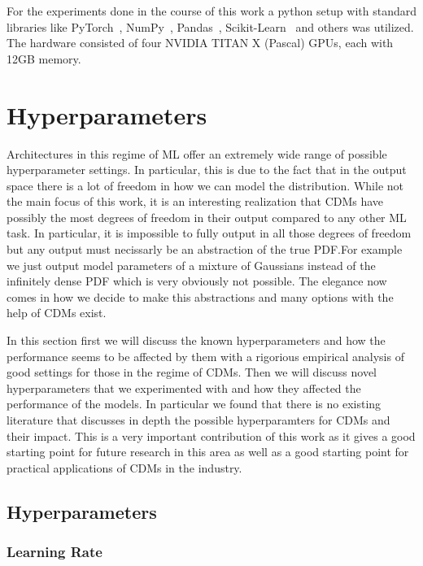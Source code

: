 For the experiments done in the course of this work a python setup with standard libraries like PyTorch~\cite{paszke2019pytorch}, NumPy~\cite{harris2020array}, Pandas~\cite{reback2020pandas}, Scikit-Learn~\cite{scikit-learn} and others was utilized. The hardware consisted of four NVIDIA TITAN X (Pascal) GPUs, each with 12GB memory.

\section{Hyperparameters}\label{sec:hyperparameters}

Architectures in this regime of ML offer an extremely wide range of possible hyperparameter settings. In particular, this is due to the fact that in the output space there is a lot of freedom in how we can model the distribution. While not the main focus of this work, it is an interesting realization that CDMs have possibly the most degrees of freedom in their output compared to any other ML task. In particular, it is impossible to fully output in all those degrees of freedom but any output must necissarly be an abstraction of the true PDF.\@ For example we just output model parameters of a mixture of Gaussians instead of the infinitely dense PDF which is very obviously not possible. The elegance now comes in how we decide to make this abstractions and many options with the help of CDMs exist.

In this section first we will discuss the known hyperparameters and how the performance seems to be affected by them with a rigorious empirical analysis of good settings for those in the regime of CDMs. Then we will discuss novel hyperparameters that we experimented with and how they affected the performance of the models. In particular we found that there is no existing literature that discusses in depth the possible hyperparamters for CDMs and their impact. This is a very important contribution of this work as it gives a good starting point for future research in this area as well as a good starting point for practical applications of CDMs in the industry.

\subsection{Hyperparameters}

\subsubsection{Learning Rate}

